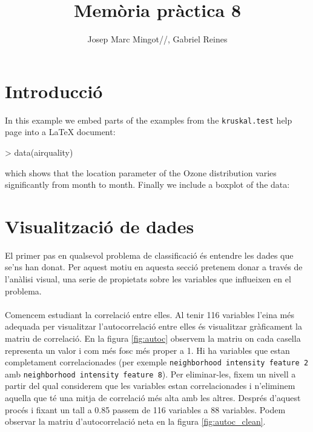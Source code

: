 \documentclass[a4paper,10pt]{article}
\title{Memòria pràctica 8}
\author{Josep Marc Mingot//, 
      Gabriel Reines}
\begin{document}



\maketitle

\begin{abstract}
\end{abstract}

\newpage
\tableofcontents

\newpage
\section{Introducció}

In this example we embed parts of the examples from the
\texttt{kruskal.test} help page into a \LaTeX{} document:
\begin{Schunk}
\begin{Sinput}
> data(airquality)
\end{Sinput}
\end{Schunk}
which shows that the location parameter of the Ozone 
distribution varies significantly from month to month. Finally we
include a boxplot of the data:



\section{Visualització de dades}

El primer pas en qualsevol problema de classificació és entendre les dades que se'ns han donat. Per aquest motiu en aquesta secció pretenem donar a través de l'anàlisi visual, una serie de propietats sobre les variables que influeixen en el problema.
\\
\\
Comencem estudiant la correlació entre elles. Al tenir 116 variables l'eina més adequada per visualitzar l'autocorrelació entre elles és visualitzar gràficament la matriu de correlació. En la figura \ref{fig:autoc} observem la matriu on cada casella representa un valor i com més fosc més proper a 1. Hi ha variables que estan completament correlacionades (per exemple \texttt{neighborhood intensity feature 2} amb \texttt{neighborhood intensity feature 8}). Per eliminar-les, fixem un nivell a partir del qual considerem que les variables estan correlacionades i n'eliminem aquella que té una mitja de correlació més alta amb les altres. Després d'aquest procés i fixant un tall a 0.85 passem de 116 variables a 88 variables. Podem observar la matriu d'autocorrelació neta en la figura \ref{fig:autoc_clean}.
\end{document}
